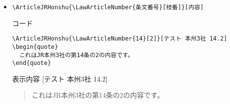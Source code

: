 \documentclass[oneside,10pt,a4paper]{jsarticle}
\begin{document}
\begin{itemize}
\begin{itembox}[l]{表示内容}
        \begin{quote}
          これはJR本州3社の第14条の内容です。
        \end{quote}
      \end{itembox}
    \item \verb|\ArticleJRHonshu{\LawArticleNumber{条文番号}[枝番]}[内容]|
      \begin{itembox}[l]{コード}
        {\footnotesize\begin{verbatim}
\ArticleJRHonshu{\LawArticleNumber{14}[2]}[テスト 本州3社 14.2]
\begin{quote}
  これはJR本州3社の第14条の2の内容です。
\end{quote}\end{verbatim}}
      \end{itembox}
      \begin{itembox}[l]{表示内容}
        [テスト 本州3社 14.2]
        \begin{quote}
          これはJR本州3社の第14条の2の内容です。
        \end{quote}
      \end{itembox}
  \end{itemize}
\end{document}
